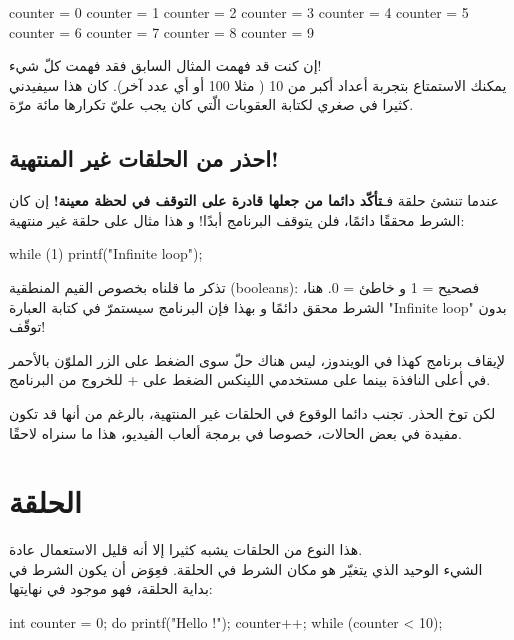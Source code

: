 \begin{Console}
counter = 0
counter = 1
counter = 2
counter = 3
counter = 4
counter = 5
counter = 6
counter = 7
counter = 8
counter = 9
\end{Console}

إن كنت قد فهمت المثال السابق فقد فهمت كلّ شيء!\\
يمكنك الاستمتاع بتجربة أعداد أكبر من 10 ( مثلا 100 أو أي عدد آخر). كان هذا سيفيدني كثيرا في صغري لكتابة العقوبات الّتي كان يجب عليّ تكرارها مائة مرّة.

\subsection{احذر من الحلقات غير المنتهية! }

عندما تنشئ حلقة فـ\textbf{تأكّد دائما من جعلها قادرة على التوقف في لحظة معينة!}
إن كان الشرط محققًا دائمًا، فلن يتوقف البرنامج أبدًا! و هذا مثال على حلقة غير منتهية:

\begin{Csource}
while (1)
{
	printf("Infinite loop\n");
}
\end{Csource}

تذكر ما قلناه بخصوص القيم المنطقية 
(\textenglish{booleans}):
فصحيح = 1 و خاطئ = 0. هنا، الشرط محقق دائمًا و بهذا فإن البرنامج سيستمرّ في كتابة العبارة 
"\textenglish{Infinite loop}"
بدون توقّف!

\begin{information}
لإيقاف برنامج كهذا في الويندوز، ليس هناك حلّ سوى الضغط على الزر 
الملوّن بالأحمر في أعلى النافذة بينما على مستخدمي اللينكس الضغط على
 + 
للخروج من البرنامج.
\end{information}
\textbf{\textbf{\textbf{}}}
لكن توخ الحذر. تجنب دائما الوقوع في الحلقات غير المنتهية، بالرغم من أنها قد تكون مفيدة في بعض الحالات، خصوصا في برمجة ألعاب الفيديو، هذا ما سنراه لاحقًا.

\section{الحلقة }

هذا النوع من الحلقات يشبه كثيرا 
إلا أنه قليل الاستعمال عادة.\\
الشيء الوحيد الذي يتغيّر هو مكان الشرط في الحلقة. فعِوَض أن يكون الشرط في بداية الحلقة، فهو موجود في نهايتها:

\begin{Csource}
int counter = 0;
do
{
	printf("Hello !\n");
	counter++;
} while (counter < 10);
\end{Csource}

